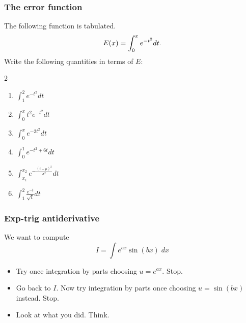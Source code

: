 \begin{frame}[t]
	\frametitle{The error function}

	The following function is tabulated.
	\[
		{\Large E(x) = \int_0^x e^{-t^2} dt}.
	\]
	Write the following quantities in terms of $E$:

	\begin{multicols}{2}
		\begin{enumerate}
			\item $\displaystyle \int_{1}^{2}e^{-t^2}dt$

				\vspace{.2cm}

			\item $\displaystyle \int_{0}^{x}t^{2}e^{-t^2}dt$

				\vspace{.2cm}

			\item $\displaystyle \int_{0}^{x}e^{-2t^2}dt$

				\vspace{.2cm}

			\item $\displaystyle \int_{0}^{1}e^{-t^2+6t}dt$

				\vspace{.2cm}

			\item $\displaystyle \int_{x_1}^{x_2}e^{-\frac{(t- \mu)^{2}}{\sigma^{2}}}dt$

				\vspace{.2cm}

			\item $\displaystyle \int_{1}^{2}\frac{e^{-t}}{\sqrt{t}}dt$
		\end{enumerate}
	\end{multicols}
\end{frame}

\begin{frame}[t]
	\frametitle{Exp-trig antiderivative}

	We want to compute
	\[
		I = \int e^{ax}\sin (bx) \; dx
	\]
	\begin{itemize}
		\item Try once integration by parts choosing $\displaystyle u = e^{ax}$.
			Stop.

		\item Go back to $I$. Now try integration by parts once choosing
			$\displaystyle u = \sin (bx)$ instead. Stop.

		\item Look at what you did. Think.
	\end{itemize}
\end{frame}

